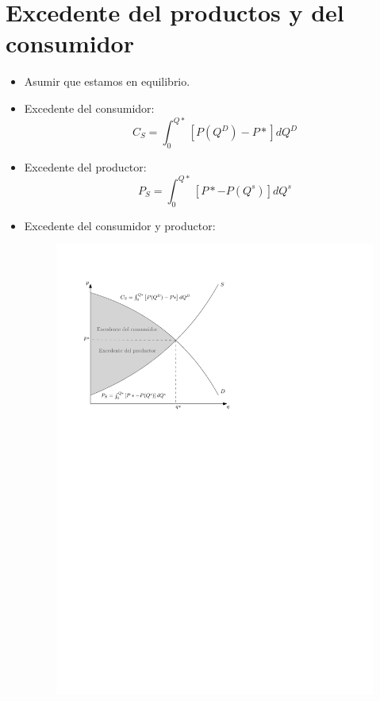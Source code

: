 \section{Excedente del productos y del consumidor}
\begin{itemize}
    \item Asumir que estamos en equilibrio.
    \item Excedente del consumidor:
        \[
          C_S = \int_{0}^{Q*}\left[P(Q^D)-P*\right]dQ^D
        \]
    
    \item Excedente del productor:
        \[
          P_S = \int_{0}^{Q*}\left[ P*-P(Q^s) \right] dQ^s
        \]
    
    \item Excedente del consumidor y productor:
        \begin{figure}[!htb]
            \centering
            \includegraphics{Clases/figs/03}
        \end{figure}
    

\end{itemize}
